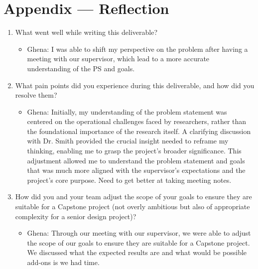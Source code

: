 \documentclass{article}
\begin{document}
\newpage{}

\section*{Appendix --- Reflection}


% 

\begin{enumerate}
    \item What went well while writing this deliverable?
    \begin{itemize}
        \item Ghena:  I was able to shift my perspective on the problem after having a meeting with our supervisor, which lead to a more accurate understanding of the PS and goals.
    \end{itemize} 
    \item What pain points did you experience during this deliverable, and how
    did you resolve them?
    \begin{itemize}
        \item Ghena: Initially, my understanding of the problem statement was centered on the operational challenges faced by researchers, rather than the foundational importance of the research itself. A clarifying discussion with Dr. Smith provided the crucial insight needed to reframe my thinking, enabling me to grasp the project's broader significance. This adjustment allowed me to understand the problem statement and goals that was much more aligned with the supervisor's expectations and the project's core purpose. Need to get better at taking meeting notes.
    \end{itemize} 
    \item How did you and your team adjust the scope of your goals to ensure
    they are suitable for a Capstone project (not overly ambitious but also of
    appropriate complexity for a senior design project)?
    \begin{itemize}
        \item Ghena: Through our meeting with our supervisor, we were able to adjust the scope of our goals to ensure they are suitable for a Capstone project. We discussed what the expected results are and what would be possible add-ons is we had time.
    \end{itemize} 
\end{enumerate}  
\end{document}
